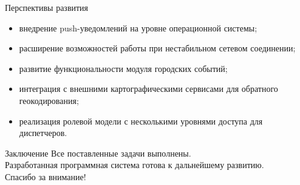 \documentclass[aspectratio=169,12pt]{beamer}
\begin{document}
\begin{frame}[c]{Перспективы развития}
    \begin{itemize}\setlength\itemsep{0.5em}
        \item внедрение push-уведомлений на уровне операционной системы;
        \item расширение возможностей работы при нестабильном сетевом соединении;
        \item развитие функциональности модуля городских событий;
        \item интеграция с внешними картографическими сервисами для обратного геокодирования;
        \item реализация ролевой модели с несколькими уровнями доступа для диспетчеров.
    \end{itemize}
\end{frame}

\begin{frame}[c]{Заключение}
    \centering
    \Large
    Все поставленные задачи выполнены.\\[0.6cm]
    Разработанная программная система готова к дальнейшему развитию.\\[0.6cm]
    Спасибо за внимание!
\end{frame}
\end{document}
